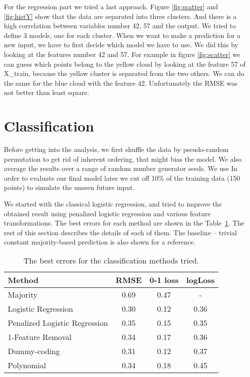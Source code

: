\documentclass{article} %
\begin{document}
For the regression part we tried a last approach.
Figure \ref{fig:scatter} and \ref{fig:histY} show that the data are separated into three clusters. And there is a high correlation between variables number 42, 57 and the output.
We tried to define 3 models, one for each cluster. 
When we want to make a prediction for a new input, we have to first decide which model we have to use.
We did this by looking at the features number 42 and 57. 
For example in figure \ref{fig:scatter} we can guess which points belong to the yellow cloud by looking at the feature 57 of X\_train, because the yellow cluster is separated from the two others. We can do the same for the blue cloud with the feature 42.
Unfortunately the RMSE was not better than least square.

\section{Classification}

Before getting into the analysis, we first shuffle the data by pseudo-random permutation to get rid of inherent ordering, that might bias the model. We also average the results over a range of random number generator seeds. We use In order to evaluate our final model later we cut off 10\% of the training data (150 points) to simulate the unseen future input.

We started with the classical logistic regression, and tried to improve the obtained result using penalized logistic regression and various feature transformations. The best errors for each method are shown in the Table~\ref{tab:classification-errors}. The rest of this section describes the details of each of them. The baseline -- trivial constant majority-based prediction is also shown for a reference.
\begin{table}[h]
  \begin{center}
    \begin{tabular}{l|ccc}
      Method & RMSE & 0-1 loss & logLoss \\
      \hline
      Majority & 0.69 & 0.47 & - \\
      Logistic Regression & 0.30 & 0.12 & 0.36 \\
      Penalized Logistic Regression & 0.35 & 0.15 & 0.35  \\
      1-Feature Removal & 0.34 & 0.17 & 0.36 \\
      Dummy-coding & 0.31 & 0.12 & 0.37 \\
      Polynomial & 0.34 & 0.18 & 0.45
    \end{tabular}
    \caption{The best errors for the classification methods tried.}
    \label{tab:classification-errors}
  \end{center}
\end{table}
\end{document}
